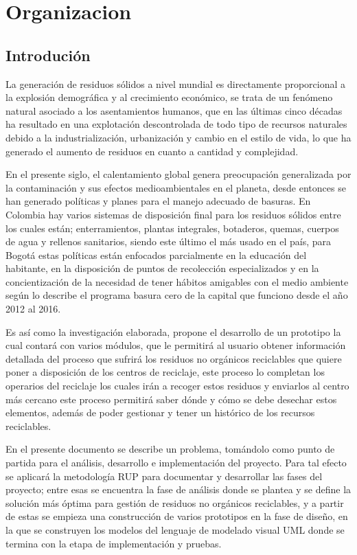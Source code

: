 \chapter{Organizacion}

\section{Introdución}

La generación de residuos sólidos a nivel mundial es directamente proporcional a la explosión demográfica y al crecimiento económico, se trata de un fenómeno natural asociado a los asentamientos humanos, que en las últimas cinco décadas ha resultado en una explotación descontrolada de todo tipo de recursos naturales debido a la industrialización, urbanización y cambio en el estilo de vida, lo que ha generado el aumento de residuos en cuanto a cantidad y complejidad.

En el presente siglo, el calentamiento global genera preocupación generalizada por la contaminación y sus efectos medioambientales en el planeta, desde entonces se han generado políticas y planes para el manejo adecuado de basuras. En Colombia hay varios sistemas de disposición final para los residuos sólidos entre los cuales están; enterramientos, plantas integrales, botaderos, quemas, cuerpos de agua y rellenos sanitarios, siendo este último el más usado en el país, para Bogotá estas políticas están enfocados parcialmente en la educación del habitante, en la disposición de puntos de recolección especializados y en la concientización de la necesidad de tener hábitos amigables con el medio ambiente según lo describe el programa basura cero de la capital que funciono desde el año 2012 al 2016.

Es así como la investigación elaborada, propone el desarrollo de un prototipo la cual contará con varios módulos, que le permitirá al usuario obtener información detallada del proceso que sufrirá los residuos no orgánicos reciclables que quiere poner a disposición de los centros de reciclaje, este proceso lo completan los operarios del reciclaje los cuales irán a recoger estos residuos y enviarlos al centro más cercano este proceso permitirá saber dónde y cómo se debe desechar estos elementos, además de poder gestionar y tener un  histórico de  los  recursos  reciclables.

En el presente documento se describe un problema, tomándolo como punto de partida para el análisis, desarrollo e implementación del proyecto. Para tal efecto se aplicará la metodología RUP para documentar y desarrollar las fases del proyecto; entre esas se encuentra la fase de análisis donde se plantea y se define la solución más óptima para gestión de residuos no orgánicos reciclables, y a partir de estas se empieza una construcción de varios prototipos en la fase de diseño, en la que se construyen los modelos del lenguaje de modelado visual UML donde se termina con la etapa de implementación y pruebas.  

